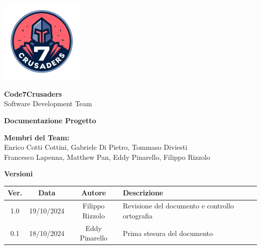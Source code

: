\documentclass{article}
\begin{document}
\begin{center}
    \vspace*{2cm}
    
    \includegraphics[width=0.3\textwidth]{../../img/logo/7Crusaders_logo.png} %
    \vspace{1cm}
    
    {\Huge \textbf{Code7Crusaders}}\\
    \vspace{0.5cm}
    {\Large Software Development Team}\\
    \vspace{2cm}
    
    {\large \textbf{Documentazione Progetto}}\\
    \vspace{5cm}

    \textbf{Membri del Team:}\\
    Enrico Cotti Cottini, Gabriele Di Pietro, Tommaso Diviesti \\
    Francesco Lapenna, Matthew Pan, Eddy Pinarello, Filippo Rizzolo \\
    \vspace{0.5cm}
    
    \vspace{1cm}
\end{center}

\newpage
\begin{table}[h!]
\centering
\textbf{Versioni} \\ %
\vspace{2mm} %
\begin{tabular}{|c|c|c|l|}
    \hline
    \textbf{Ver.} & \textbf{Data} & \textbf{Autore} & \textbf{Descrizione} \\
    \hline
    1.0 & 19/10/2024 & Filippo Rizzolo & Revisione del documento e controllo ortografia \\ 
    \hline
    0.1 & 18/10/2024 & Eddy Pinarello & Prima stesura del documento \\ 
    \hline
\end{tabular}
\end{table}
\end{document}
